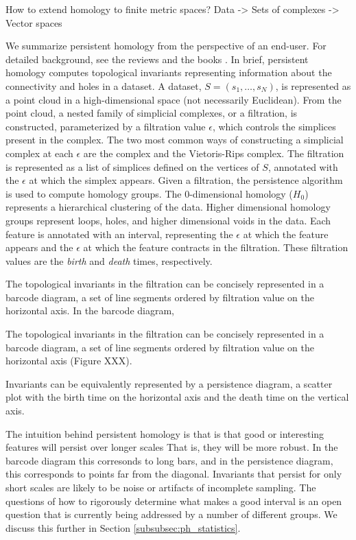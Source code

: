How to extend homology to finite metric spaces?
Data -> Sets of complexes -> Vector spaces

We summarize persistent homology from the perspective of an end-user.
For detailed background, see the reviews \cite{Carlsson:2009a,Ghrist:2008} and the books \cite{Edelsbrunner:2010,Zomorodian:2005b}.
In brief, persistent homology computes topological invariants representing information about the connectivity and holes in a dataset.
A dataset, $S=(s_{1},\ldots,s_{N})$, is represented as a point cloud in a high-dimensional space (not necessarily Euclidean).
From the point cloud, a nested family of simplicial complexes, or a filtration, is constructed, parameterized by a filtration value $\epsilon$, which controls the simplices present in the complex.
The two most common ways of constructing a simplicial complex at each $\epsilon$ are the \Cech complex and the Vietoris-Rips complex.
The filtration is represented as a list of simplices defined on the vertices of $S$, annotated with the $\epsilon$ at which the simplex appears.
Given a filtration, the persistence algorithm is used to compute homology groups.
The $0$-dimensional homology ($H_0$) represents a hierarchical clustering of the data.
Higher dimensional homology groups represent loops, holes, and higher dimensional voids in the data.
Each feature is annotated with an interval, representing the $\epsilon$ at which the feature appears and the $\epsilon$ at which the feature contracts in the filtration.
These filtration values are the \emph{birth} and \emph{death} times, respectively.

The topological invariants in the filtration can be concisely represented in a barcode diagram, a set of line segments ordered by filtration value on the horizontal axis.
In the barcode diagram,

The topological invariants in the filtration can be concisely represented in a barcode diagram, a set of line segments ordered by filtration value on the horizontal axis (Figure XXX).

Invariants can be equivalently represented by a persistence diagram, a scatter plot with the birth time on the horizontal axis and the death time on the vertical axis.

The intuition behind persistent homology is that is that good or interesting features will persist over longer scales
That is, they will be more robust.
In the barcode diagram this corresonds to long bars, and in the persistence diagram, this corresponds to points far from the diagonal.
Invariants that persist for only short scales are likely to be noise or artifacts of incomplete sampling.
The questions of how to rigorously determine what makes a good interval is an open question that is currently being addressed by a number of different groups.
We discuss this further in Section \ref{subsubsec:ph_statistics}.

